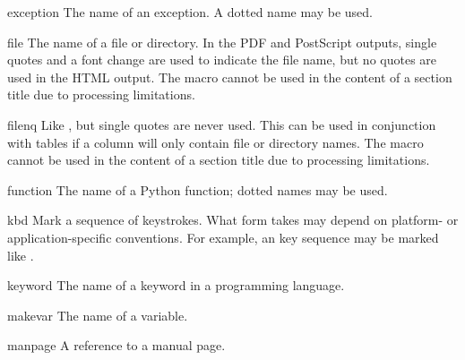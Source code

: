\documentclass{howto}
\begin{document}
    \begin{macrodesc}{exception}{}
      The name of an exception.  A dotted name may be used.
    \end{macrodesc}

    \begin{macrodesc}{file}{}
      The name of a file or directory.  In the PDF and PostScript
      outputs, single quotes and a font change are used to indicate
      the file name, but no quotes are used in the HTML output.
       The  macro cannot be used in the
      content of a section title due to processing limitations.
    \end{macrodesc}

    \begin{macrodesc}{filenq}{}
      Like , but single quotes are never used.  This can
      be used in conjunction with tables if a column will only contain 
      file or directory names.
       The  macro cannot be used in the
      content of a section title due to processing limitations.
    \end{macrodesc}

    \begin{macrodesc}{function}{}
      The name of a Python function; dotted names may be used.
    \end{macrodesc}

    \begin{macrodesc}{kbd}{}
      Mark a sequence of keystrokes.  What form 
      takes may depend on platform- or application-specific
      conventions.  For example, an  key sequence
      may be marked like .
    \end{macrodesc}

    \begin{macrodesc}{keyword}{}
      The name of a keyword in a programming language.
    \end{macrodesc}

    \begin{macrodesc}{makevar}{}
      The name of a  variable.
    \end{macrodesc}

    \begin{macrodesc}{manpage}{}
      A reference to a \UNIX{} manual page.
    \end{macrodesc}
\end{document}

